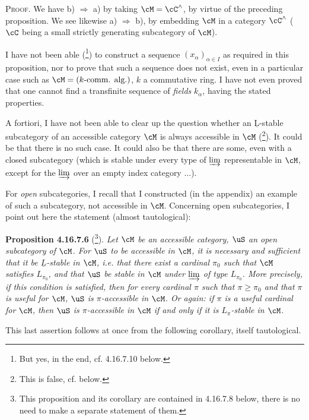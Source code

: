 \textsc{Proof}. We have b) $\Longrightarrow$ a) by taking $\cM = \cC^\wedge$, by virtue of the preceding proposition. We see likewise a) $\Longrightarrow$ b), by embedding $\cM$ in a category $\cC^\wedge$ ($\cC$ being a small strictly generating subcategory of $\cM$).

I have not been able (\footnote{But yes, in the end, cf. 4.16.7.10 below.}) to construct a sequence $(x_\alpha)_{\alpha\in I}$ as required in this proposition, nor to prove that such a sequence does not exist, even in a particular case such as $\cM = (k\text{-comm. alg.})$, $k$ a commutative ring. I have not
even proved that one cannot find a transfinite sequence of \textit{fields} $k_\alpha$, having the stated properties.

A fortiori, I have not been able to clear up the question whether an $\underline{\mathrm{L}}$-stable subcategory of an accessible category $\cM$ is always accessible in $\cM$ (\footnote{This is false, cf. below.}). It could be that there is no such case. It could also be that there are some, even with a closed subcategory (which is stable under every type of $\varinjlim$ representable in $\cM$, except for the $\varinjlim$ over an empty index category $\ldots$).


For \textit{open} subcategories, I recall that I constructed (in the appendix) an example of such a subcategory, not accessible in $\cM$. Concerning open subcategories, I point out here the statement (almost tautological):

\textbf{Proposition 4.16.7.6} (\footnote{This proposition and its corollary are contained in 4.16.7.8 below, there is no need to make a separate statement of them.}). \textit{Let $\cM$ be an accessible category, $\uS$ an \textup{open} subcategory of $\cM$. For $\uS$ to be accessible in $\cM$, it is necessary and sufficient that it be $\underline{L}$-stable in $\cM$, i.e. that there exist a cardinal $\pi_0$ such that $\cM$ satisfies $L_{\pi_0}$, and that $\uS$ be stable in $\cM$ under $\varinjlim$ of type $L_{\pi_0}$. More precisely, if this condition is satisfied, then for every cardinal $\pi$ such that $\pi \geqslant \pi_0$ and that $\pi$ is useful for $\cM$, $\uS$ is $\pi$-accessible in $\cM$. Or again: if $\pi$ is a useful cardinal for $\cM$, then $\uS$ is $\pi$-accessible in $\cM$ if and only if it is $L_\pi$-stable in $\cM$.}

This last assertion follows at once from the following corollary, itself tautological.

